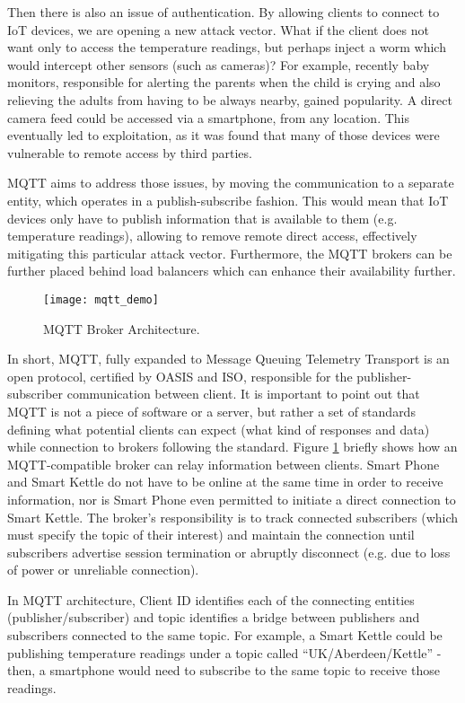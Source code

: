 Then there is also an issue of authentication. By allowing clients to connect to IoT devices, we are opening a new attack vector. What if the client does not want only to access the temperature readings, but perhaps inject a worm which would intercept other sensors (such as cameras)? For example, recently baby monitors, responsible for alerting the parents when the child is crying and also relieving the adults from having to be always nearby, gained popularity. A direct camera feed could be accessed via a smartphone, from any location. This eventually led to exploitation, as it was found that many of those devices were vulnerable to remote access by third parties\cite{pultarova2016webcam}.

MQTT aims to address those issues, by moving the communication to a separate entity, which operates in a publish-subscribe fashion. This would mean that IoT devices only have to publish information that is available to them (e.g. temperature readings), allowing to remove remote direct access, effectively mitigating this particular attack vector. Furthermore, the MQTT brokers can be further placed behind load balancers which can enhance their availability further.

\begin{figure}[ht]
    \centering
    \texttt{[image: mqtt\_demo]}
    \caption{MQTT Broker Architecture.}
    \label{fig:mqtt}
\end{figure}

In short, MQTT, fully expanded to Message Queuing Telemetry Transport is an open protocol, certified by OASIS and ISO\cite{banks2019mqtt}, responsible for the publisher-subscriber communication between client. It is important to point out that MQTT is not a piece of software or a server, but rather a set of standards defining what potential clients can expect (what kind of responses and data) while connection to brokers following the standard. Figure \ref{fig:mqtt} briefly shows how an MQTT-compatible broker can relay information between clients. Smart Phone and Smart Kettle do not have to be online at the same time in order to receive information, nor is Smart Phone even permitted to initiate a direct connection to Smart Kettle. The broker's responsibility is to track connected subscribers (which must specify the topic of their interest) and maintain the connection until subscribers advertise session termination or abruptly disconnect (e.g. due to loss of power or unreliable connection).

In MQTT architecture, Client ID identifies each of the connecting entities (publisher/subscriber) and topic identifies a bridge between publishers and subscribers connected to the same topic. For example, a Smart Kettle could be publishing temperature readings under a topic called ``UK/Aberdeen/Kettle'' - then, a smartphone would need to subscribe to the same topic to receive those readings. 

